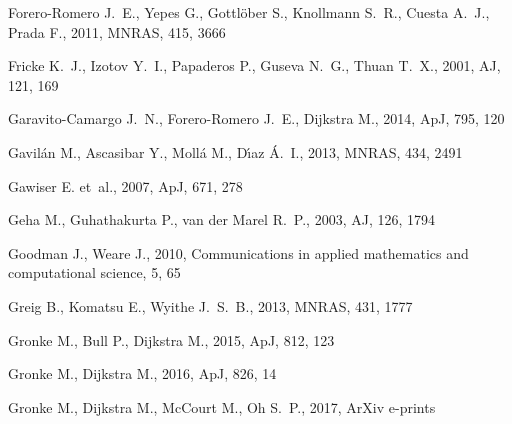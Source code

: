 \documentclass[a4,useAMS,usenatbib,usegraphicx]{mn2e}
\newcommand{\apj}{ApJ}
\newcommand{\aj}{AJ}
\newcommand{\mnras}{MNRAS}
\begin{document}
\begin{thebibliography}{}
{Forero-Romero} J.~E.,  {Yepes} G.,  {Gottl{\"o}ber} S.,  {Knollmann} S.~R.,
  {Cuesta} A.~J.,    {Prada} F.,  2011, \mnras, 415, 3666

{Fricke} K.~J.,  {Izotov} Y.~I.,  {Papaderos} P.,  {Guseva} N.~G.,    {Thuan}
  T.~X.,  2001, \aj, 121, 169

{Garavito-Camargo} J.~N.,  {Forero-Romero} J.~E.,    {Dijkstra} M.,  2014,
  \apj, 795, 120

{Gavil{\'a}n} M.,  {Ascasibar} Y.,  {Moll{\'a}} M.,    {D{\'{\i}}az} {\'A}.~I.,
   2013, \mnras, 434, 2491

{Gawiser} E.  et~al., 2007, \apj, 671, 278

{Geha} M.,  {Guhathakurta} P.,    {van der Marel} R.~P.,  2003, \aj, 126, 1794

Goodman J.,  Weare J.,  2010, Communications in applied mathematics and
  computational science, 5, 65

{Greig} B.,  {Komatsu} E.,    {Wyithe} J.~S.~B.,  2013, \mnras, 431, 1777

{Gronke} M.,  {Bull} P.,    {Dijkstra} M.,  2015, \apj, 812, 123

{Gronke} M.,  {Dijkstra} M.,  2016, \apj, 826, 14

{Gronke} M.,  {Dijkstra} M.,  {McCourt} M.,    {Oh} S.~P.,  2017, ArXiv
  e-prints


\end{thebibliography}
\end{document}
